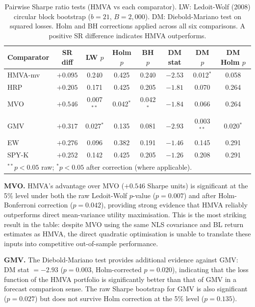 \documentclass[a4paper,12pt]{report}
\begin{document}
\begin{table}[H]
  \centering
  \caption{Pairwise Sharpe ratio tests (HMVA vs each comparator). LW:
           Ledoit-Wolf (2008) circular block bootstrap ($b=21$,
           $B=2{,}000$). DM: Diebold-Mariano test on squared losses.
           Holm and BH corrections applied across all six comparisons.
           A positive SR difference indicates HMVA outperforms.}
  \label{tab:res-tests}
  \begin{tabular}{@{}lccccccc@{}}
    \toprule
    Comparator & SR diff & LW $p$ & Holm $p$ & BH $p$
               & DM stat & DM $p$ & DM Holm $p$ \\
    \midrule
    HMVA-mv & $+0.095$ & 0.240 & 0.425 & 0.240
            & $-2.53$ & 0.012$^{*}$  & 0.058 \\
    HRP     & $+0.205$ & 0.171 & 0.425 & 0.205
            & $-1.81$ & 0.070 & 0.264 \\
    MVO     & $+0.546$ & 0.007$^{**}$ & 0.042$^{*}$ & 0.042$^{*}$
            & $-1.84$ & 0.066 & 0.264 \\
    GMV     & $+0.317$ & 0.027$^{*}$  & 0.135 & 0.081
            & $-2.93$ & 0.003$^{**}$ & 0.020$^{*}$ \\
    EW      & $+0.276$ & 0.096 & 0.382 & 0.191
            & $-1.46$ & 0.145 & 0.291 \\
    SPY-K   & $+0.252$ & 0.142 & 0.425 & 0.205
            & $-1.26$ & 0.208 & 0.291 \\
    \bottomrule
    \multicolumn{8}{l}{\small $^{**}p < 0.05$ raw; $^{*}p < 0.05$ after correction (where applicable).} \\
  \end{tabular}
\end{table}

\textbf{MVO.} HMVA's advantage over MVO ($+0.546$ Sharpe units) is
significant at the 5\% level under both the raw Ledoit-Wolf $p$-value
($p = 0.007$) and after Holm-Bonferroni correction ($p = 0.042$),
providing strong evidence that HMVA reliably outperforms direct
mean-variance utility maximisation. This is the most striking result
in the table: despite MVO using the same NLS covariance and BL return
estimates as HMVA, the direct quadratic optimisation is unable to translate
these inputs into competitive out-of-sample performance.

\textbf{GMV.} The Diebold-Mariano test provides additional evidence against
GMV: DM stat $= -2.93$ ($p = 0.003$, Holm-corrected $p = 0.020$), indicating
that the loss function of the HMVA portfolio is significantly better than
that of GMV in a forecast comparison sense. The raw Sharpe bootstrap for
GMV is also significant ($p = 0.027$) but does not survive Holm correction
at the 5\% level ($p = 0.135$).
\end{document}
